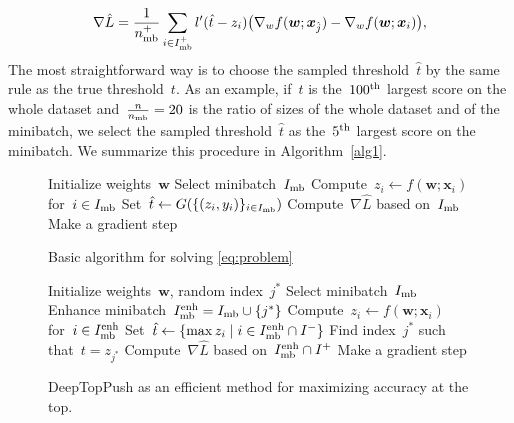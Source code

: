 \begin{equation}\label{eq:grad2}
  \nabla \hat L = \frac{1}{n_{\rm mb}^+}\sum_{i\in I_{\rm mb}^+}l'(\hat t-z_i)\big(\nabla_w f(\bm{w};\bm{x}_{\hat j}) - \nabla_w f(\bm{w};\bm{x}_i) \big),
\end{equation}
The most straightforward way is to choose the sampled threshold~$\hat t$ by the same rule as the true threshold~$t$. As an example, if~$t$ is the~$100^{\rm th}$ largest score on the whole dataset and~$\frac{n}{n_{\rm mb}}=20$ is the ratio of sizes of the whole dataset and of the minibatch, we select the sampled threshold~$\hat t$ as the~$5^{\rm th}$ largest score on the minibatch. We summarize this procedure in Algorithm~\ref{alg1}.

\begin{figure}
  \begin{minipage}{0.48\textwidth}
    \begin{algorithm}[H]
      \centering
      \begin{algorithmic}[1]
        \State Initialize weights~$\bm{w}$
        \Repeat
        \State Select minibatch~$I_{\rm mb}$
        \State \phantom{$\Iminh$}
        \State Compute~$z_i\gets f(\bm{w};\bm{x}_i)$ for~$i\in I_{\rm mb}$
        \State Set~$\hat t \gets G(\{(z_i,y_i)\}_{i\in I_{\rm mb}})$
        \State 
        \State Compute~$\nabla \hat L$ based on~$I_{\rm mb}$\phantom{$\Iminh$}
        \State Make a gradient step
      \end{algorithmic}
      \caption{Basic algorithm for solving \eqref{eq:problem} \\}
      \label{alg1}
    \end{algorithm}
  \end{minipage}
  \hfill
  \begin{minipage}{0.48\textwidth}
    \begin{algorithm}[H]
      \centering
      \begin{algorithmic}[1]
        \State Initialize weights~$\bm{w}$, random index~$j^*$
        \Repeat
        \State Select minibatch~$I_{\rm mb}$
        \State Enhance minibatch~$I_{\rm mb}^{\rm enh} = I_{\rm mb} \cup \{j^*\}$
        \State Compute~$z_i\gets f(\bm{w};\bm{x}_i)$ for~$i\in I_{\rm mb}^{\rm enh}$
        \State Set~$\hat t \gets \{\max z_i \mid i\in I_{\rm mb}^{\rm enh} \cap I^-\}$
        \State Find index~$j^*$ such that~$t = z_{j^*}$
        \State Compute~$\nabla \hat L$ based on~$I_{\rm mb}^{\rm enh}\cap I^+$
        \State Make a gradient step
      \end{algorithmic}
      \caption{DeepTopPush as an efficient method for maximizing accuracy at the top.}
      \label{alg2}
    \end{algorithm}
  \end{minipage}
\end{figure}

